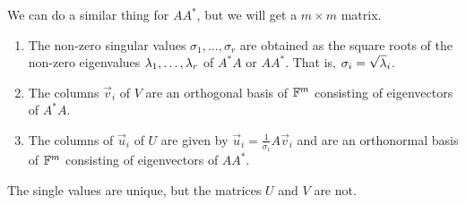 \documentclass{article}
\begin{document}
We can do a similar thing for $AA^*$, but we will get a $m\times m$ matrix.\\

\begin{enumerate}
  \item The non-zero singular values $\sigma_1, \dots, \sigma_r$ are obtained as the square roots of the non-zero eigenvalues $\lambda_1,\dots,\lambda_r$ of $A^*A$ or $AA^*$. That is, $\displaystyle{\sigma_i = \sqrt{\lambda}_i}$.
  \item The columns $\vec v_i$ of $V$ are an orthogonal basis of $\mathbb{F}^m$ consisting of eigenvectors of $A^*A$.
  \item The columns of $\vec u_i$ of $U$ are given by $\vec u_i = \frac{1}{\sigma_i}A\vec v_i$ and are an orthonormal basis of $\mathbb{F}^m$ consisting of eigenvectors of $AA^*$.
\end{enumerate}
The single values are unique, but the matrices $U$ and $V$ are not.
\end{document}
